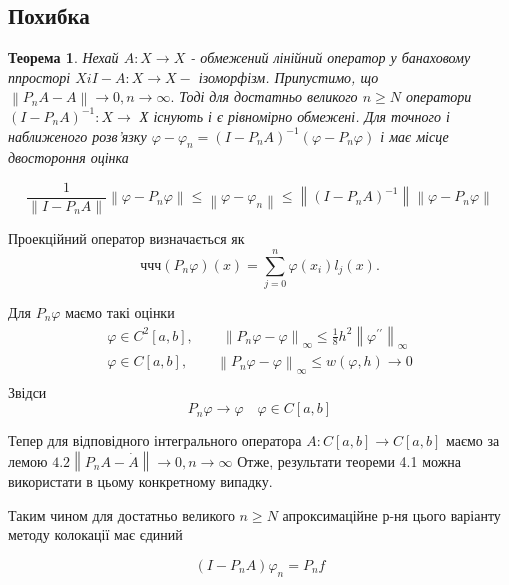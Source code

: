 \documentclass[14pt,a4paper]{extarticle}
\newcounter{e}
\newtheorem{theorem}{Теорема}[section]
\numberwithin{equation}{section}
\begin{document}
 \subsection{Похибка}
 
	\begin{theorem}
		Нехай $A: X \rightarrow X$ - обмежений лінійний оператор у банаховому ппросторі $X i I-A: X \rightarrow X-$ ізоморфізм. Припустимо, що $\left\|P_{n} A-A\right\| \rightarrow 0, n \rightarrow \infty .$ Тоді для достатньо великого $n \geq N$ оператори $\left(I-P_{n} A\right)^{-1}: X \rightarrow$ Х існують і є рівномірно обмежені. Для точного і наближеного розв'язку $\varphi-\varphi_{n}=\left(I-P_{n} A\right)^{-1}\left(\varphi-P_{n} \varphi\right)$ і має місце двостороння оцінка
	\end{theorem} 

 $$
 \frac{1}{\left\|I-P_{n} A\right\|}\left\|\varphi-P_{n} \varphi\right\| \leq\left\|\varphi-\varphi_{n}\right\| \leq\left\|\left(I-P_{n} A\right)^{-1}\right\|\left\|\varphi-P_{n} \varphi\right\|
 $$
 
 
Проекційний оператор визначається як
 $$ччч
 \left(P_{n} \varphi\right)(x)= \sum_{j=0}^{n} \varphi\left(x_{i}\right) l_{j}(x) .
 $$
 
 Для $P_{n} \varphi$ маємо такі оцінки 
 $$
 \begin{array}{l}
 	\displaystyle
	\varphi \in C^{2}[a, b], \quad \quad \left\|P_{n} \varphi-\varphi\right\|_{\infty} \leq \frac{1}{8} h^{2}\left\|\varphi^{\prime \prime}\right\|_{\infty}  
	\\[0.3cm]
 	
 	\displaystyle
	\varphi \in C[a, b], \quad \quad \left\|P_{n} \varphi-\varphi\right\|_{\infty} \leq w(\varphi, h) \rightarrow 0
	\\[0.3cm]	
\end{array}
 $$
 Звідси 
 $$ 
 P_{n} \varphi \rightarrow \varphi  \quad  \varphi \in C[a, b]
 $$
 
 Тепер для відповідного інтегрального оператора $A: C[a, b] \rightarrow C[a, b]$ маємо за лемою $4.2\left\|P_{n} A-\dot{A}\right\| \rightarrow 0, n \rightarrow \infty$
 Отже, результати теореми 4.1 можна використати в цьому конкретному випадку. 
 

 Таким чином для достатньо великого $n \geq N$ апроксимаційне р-ня цього варіанту методу колокації  має єдиний
 
\begin{equation}
\left(I-P_{n} A\right) \varphi_{n}=P_{n} f
\end{equation}
 
\end{document}
